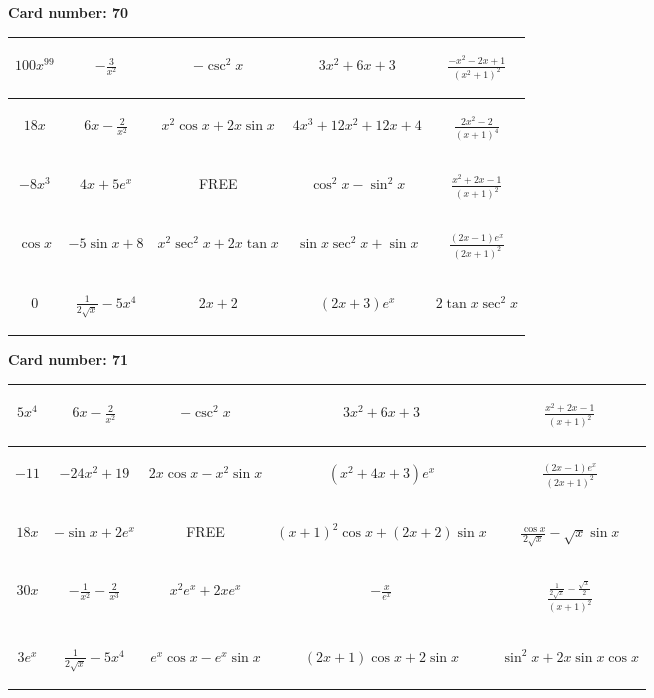 \documentclass{article}
\newcommand{\entry}[1]{\begin{minipage}[t][2.75cm][t]{4cm} \vspace{1cm} \begin{center}#1\end{center} \end{minipage}}
\newcommand{\freespace}{\entry{FREE}}
\newcommand{\cardnumber}[1]{\noindent \textbf{Card number: #1} \bigskip}
\begin{document}
\pagebreak

\cardnumber{70}
\begin{center}
\begin{tabular}{|*{5}{c|}}
    \hline
    \entry{$100x^{99}$} & \entry{$-\frac{3}{x^2}$} & \entry{$-\csc^2 x$} & \entry{$3x^2 + 6x + 3$} & \entry{$\frac{-x^2 - 2x + 1}{(x^2 + 1)^2}$} \\ \hline
    \entry{$18x$} & \entry{$6x - \frac{2}{x^2}$} & \entry{$x^2 \cos x + 2x \sin x$} & \entry{$4x^3 + 12x^2 + 12x + 4$} & \entry{$\frac{2x^2 - 2}{(x + 1)^4}$} \\ \hline
    \entry{$-8x^3$} & \entry{$4x + 5e^x$} & \freespace & \entry{$\cos^2 x - \sin^2 x$} & \entry{$\frac{x^2 + 2x - 1}{(x + 1)^2}$} \\ \hline
    \entry{$\cos x$} & \entry{$-5 \sin x + 8$} & \entry{$x^2 \sec^2 x + 2x \tan x$} & \entry{$\sin x \sec^2 x + \sin x$} & \entry{$\frac{(2x - 1) e^x}{(2x + 1)^2}$} \\ \hline
    \entry{$0$} & \entry{$\frac{1}{2\sqrt{x}} - 5x^4$} & \entry{$2x + 2$} & \entry{$(2x + 3) e^x$} & \entry{$2 \tan x \sec^2 x$} \\ \hline
\end{tabular}
\end{center}

\pagebreak

\cardnumber{71}
\begin{center}
\begin{tabular}{|*{5}{c|}}
    \hline
    \entry{$5x^4$} & \entry{$6x - \frac{2}{x^2}$} & \entry{$-\csc^2 x$} & \entry{$3x^2 + 6x + 3$} & \entry{$\frac{x^2 + 2x - 1}{(x + 1)^2}$} \\ \hline
    \entry{$-11$} & \entry{$-24x^2 + 19$} & \entry{$2x \cos x - x^2 \sin x$} & \entry{$(x^2 + 4x + 3) e^x$} & \entry{$\frac{(2x - 1) e^x}{(2x + 1)^2}$} \\ \hline
    \entry{$18x$} & \entry{$-\sin x + 2e^x$} & \freespace & \entry{$(x + 1)^2 \cos x + (2x + 2) \sin x$} & \entry{$\frac{\cos x}{2 \sqrt{x}} - \sqrt{x} \sin x$} \\ \hline
    \entry{$30x$} & \entry{$-\frac{1}{x^2} - \frac{2}{x^3}$} & \entry{$x^2 e^x + 2x e^x$} & \entry{$-\frac{x}{e^x}$} & \entry{$\frac{\frac{1}{2 \sqrt{x}} - \frac{\sqrt{x}}{2}}{(x + 1)^2}$} \\ \hline
    \entry{$3e^x$} & \entry{$\frac{1}{2\sqrt{x}} - 5x^4$} & \entry{$e^x \cos x - e^x \sin x$} & \entry{$(2x + 1) \cos x + 2 \sin x$} & \entry{$\sin^2 x + 2x \sin x \cos x$} \\ \hline
\end{tabular}
\end{center}
\end{document}
